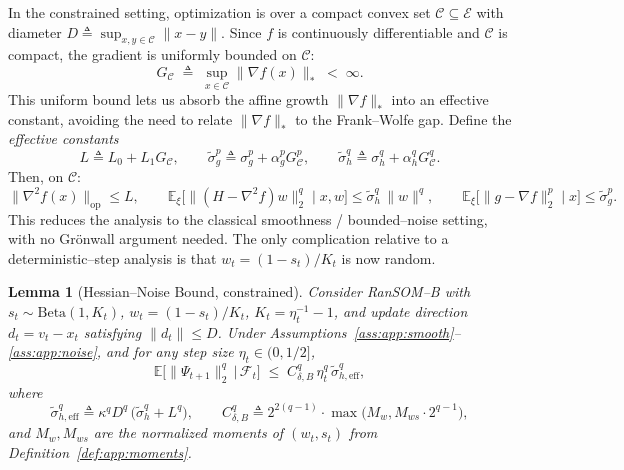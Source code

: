 \documentclass{article}
\theoremstyle{plain}
\newtheorem{lemma}[theorem]{Lemma}
\theoremstyle{definition}
\theoremstyle{remark}
\begin{document}
In the constrained setting, optimization is over a compact convex set
$\mathcal{C} \subseteq \mathcal{E}$ with diameter $D \triangleq
\sup_{x, y \in \mathcal{C}}\|x - y\|$. Since $f$ is continuously
differentiable and $\mathcal{C}$ is compact, the gradient is uniformly
bounded on $\mathcal{C}$:
\begin{equation}
  G_\mathcal{C} \;\triangleq\; \sup_{x \in \mathcal{C}}\|\nabla f(x)\|_*
  \;<\; \infty.
  \label{eq:app:grad-bound}
\end{equation}
This uniform bound lets us absorb the affine growth $\|\nabla f\|_*$
into an effective constant, avoiding the need to relate $\|\nabla f\|_*$
to the Frank--Wolfe gap. Define the \emph{effective constants}
\begin{equation}
  L \triangleq L_0 + L_1 G_\mathcal{C}, \qquad
  \tilde\sigma_g^p \triangleq \sigma_g^p + \alpha_g^p G_\mathcal{C}^p,
  \qquad
  \tilde\sigma_h^q \triangleq \sigma_h^q + \alpha_h^q G_\mathcal{C}^q.
  \label{eq:app:eff-const}
\end{equation}
Then, on $\mathcal{C}$:
\[
  \|\nabla^2 f(x)\|_{\mathrm{op}} \leq L,
  \qquad
  \mathbb{E}_\xi\bigl[\|(H-\nabla^2 f)w\|_2^q \mid x, w\bigr]
  \leq \tilde\sigma_h^q\,\|w\|^q,
  \qquad
  \mathbb{E}_\xi\bigl[\|g - \nabla f\|_2^p \mid x\bigr] \leq \tilde\sigma_g^p.
\]
This reduces the analysis to the classical smoothness / bounded--noise
setting, with no Gr\"onwall argument needed. The only complication
relative to a deterministic--step analysis is that $w_t = (1-s_t)/K_t$
is now random.

\begin{lemma}[Hessian--Noise Bound, constrained]
\label{lem:app:hess-noise-b}
Consider RanSOM--B with $s_t \sim \mathrm{Beta}(1, K_t)$, $w_t =
(1-s_t)/K_t$, $K_t = \eta_t^{-1} - 1$, and update direction $d_t = v_t -
x_t$ satisfying $\|d_t\| \leq D$. Under
Assumptions~\ref{ass:app:smooth}--\ref{ass:app:noise}, and for any step
size $\eta_t \in (0, 1/2]$,
\begin{equation}
  \mathbb{E}\bigl[\|\Psi_{t+1}\|_2^q \,\big|\, \mathcal{F}_t\bigr]
  \;\leq\; C_{\delta,B}^q\, \eta_t^q\, \tilde\sigma_{h,\mathrm{eff}}^q,
  \label{eq:app:hess-noise-b}
\end{equation}
where
\begin{equation}
  \tilde\sigma_{h,\mathrm{eff}}^q
  \triangleq \kappa^q D^q\,\bigl(\tilde\sigma_h^q + L^q\bigr),
  \qquad
  C_{\delta,B}^q \triangleq 2^{2(q-1)}\cdot \max\!\bigl(M_w, M_{ws}\cdot 2^{q-1}\bigr),
  \label{eq:app:sigma-b}
\end{equation}
and $M_w, M_{ws}$ are the normalized moments of $(w_t, s_t)$ from
Definition~\ref{def:app:moments}.
\end{lemma}
\end{document}
